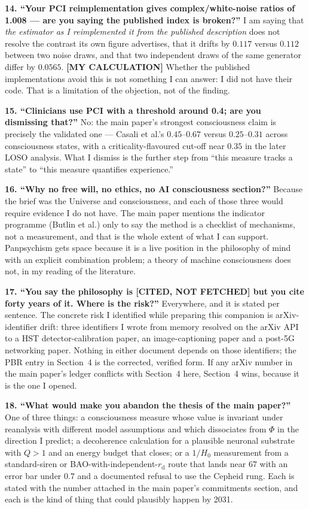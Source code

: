 \documentclass[11pt]{article}
\begin{document}
\textbf{14. ``Your PCI reimplementation gives complex/white-noise ratios of 1.008 --- are you saying
the published index is broken?''} I am saying that \emph{the estimator as I reimplemented it from the
published description} does not resolve the contrast its own figure advertises, that it drifts by
$0.117$ versus $0.112$ between two noise draws, and that two independent draws of the same generator
differ by $0.0565$. \textbf{[MY CALCULATION]} Whether the published implementations avoid this is not
something I can answer: I did not have their code. That is a limitation of the objection, not of the
finding.

\textbf{15. ``Clinicians use PCI with a threshold around 0.4; are you dismissing that?''} No: the main
paper's strongest consciousness claim is precisely the validated one --- Casali et al.'s
$0.45$--$0.67$ versus $0.25$--$0.31$ across consciousness states, with a criticality-flavoured
cut-off near $0.35$ in the later LOSO analysis. What I dismiss is the further step from ``this
measure tracks a state'' to ``this measure quantifies experience.''

\textbf{16. ``Why no free will, no ethics, no AI consciousness section?''} Because the brief was the
Universe and consciousness, and each of those three would require evidence I do not have. The main
paper mentions the indicator programme (Butlin et al.) only to say the method is a checklist of
mechanisms, not a measurement, and that is the whole extent of what I can support. Panpsychism gets
space because it is a live position in the philosophy of mind with an explicit combination problem; a
theory of machine consciousness does not, in my reading of the literature.

\textbf{17. ``You say the philosophy is [CITED, NOT FETCHED] but you cite forty years of it. Where is
the risk?''} Everywhere, and it is stated per sentence. The concrete risk I identified while preparing
this companion is arXiv-identifier drift: three identifiers I wrote from memory resolved on the arXiv
API to a HST detector-calibration paper, an image-captioning paper and a post-5G networking paper.
Nothing in either document depends on those identifiers; the PBR entry in Section~4 is the corrected,
verified form. If any arXiv number in the main paper's ledger conflicts with Section~4 here, Section~4
wins, because it is the one I opened.

\textbf{18. ``What would make you abandon the thesis of the main paper?''} One of three things: a
consciousness measure whose value is invariant under reanalysis with different model assumptions and
which dissociates from $\Phi$ in the direction I predict; a decoherence calculation for a plausible
neuronal substrate with $Q>1$ and an energy budget that closes; or a $1/H_0$ measurement from a
standard-siren or BAO-with-independent-$r_{\text{d}}$ route that lands near $67$ with an error bar under
$0.7$ and a documented refusal to use the Cepheid rung. Each is stated with the number attached in the
main paper's commitments section, and each is the kind of thing that could plausibly happen by 2031.
\end{document}
